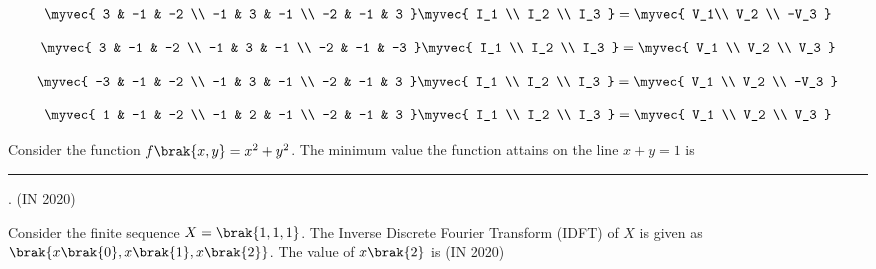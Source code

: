 \begin{enumerate}
\begin{multicols}{2}
\item
\begin{align*}
\myvec{ 3 & -1 & -2 \\ -1 & 3 & -1 \\ -2 & -1 & 3 } \myvec{ I_1 \\ I_2 \\ I_3 } = \myvec{ V_1\\ V_2 \\ -V_3 }
\end{align*}
\item
\begin{align*}
\myvec{ 3 & -1 & -2 \\ -1 & 3 & -1 \\ -2 & -1 & -3 } \myvec{ I_1 \\ I_2 \\ I_3 } = \myvec{ V_1 \\ V_2 \\ V_3 }
\end{align*}
\item 
\begin{align*}
\myvec{ -3 & -1 & -2 \\ -1 & 3 & -1 \\ -2 & -1 & 3 } \myvec{ I_1 \\ I_2 \\ I_3 } = \myvec{ V_1 \\ V_2 \\ -V_3 }
\end{align*}
\item 
\begin{align*}
\myvec{ 1 & -1 & -2 \\ -1 & 2 & -1 \\ -2 & -1 & 3 } \myvec{ I_1 \\ I_2 \\ I_3 } = \myvec{ V_1 \\ V_2 \\ V_3 }
\end{align*}
\end{multicols}
\end{enumerate}


\item Consider the function $f\brak{x, y} = x^2 + y^2$. The minimum value the function attains on the line $x + y = 1$  is \rule{1cm}{0.01pt}.
\hfill{(IN 2020)}
\item Consider the finite sequence $X = \brak{1, 1, 1}$. The Inverse Discrete Fourier Transform (IDFT) of $X$ is given as $\brak{x\brak{0}, x\brak{1}, x\brak{2}}$. The value of $x\brak{2}$ is 
\hfill{(IN 2020)}

